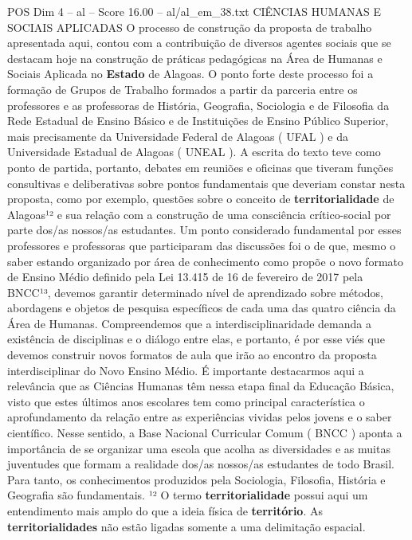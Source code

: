 \begin{textsample}{POS Dim 4 – al – Score 16.00 – al/al\_em\_38.txt}  \label{ex:f4_pos_047}
CIÊNCIAS HUMANAS E SOCIAIS APLICADAS O processo de construção da proposta de trabalho apresentada aqui, contou com a contribuição de diversos agentes sociais que se destacam hoje na construção de práticas pedagógicas na Área de Humanas e Sociais Aplicada no \textbf{Estado} de Alagoas.
O ponto forte deste processo foi a formação de Grupos de Trabalho formados a partir da parceria entre os professores e as professoras de História, Geografia, Sociologia e de Filosofia da Rede Estadual de Ensino Básico e de Instituições de Ensino Público Superior, mais precisamente da Universidade Federal de Alagoas ( UFAL ) e da Universidade Estadual de Alagoas ( UNEAL ).
A escrita do texto teve como ponto de partida, portanto, debates em reuniões e oficinas que tiveram funções consultivas e deliberativas sobre pontos fundamentais que deveriam constar nesta proposta, como por exemplo, questões sobre o conceito de \textbf{territorialidade} de Alagoas¹² e sua relação com a construção de uma consciência crítico-social por parte dos/as nossos/as estudantes.
Um ponto considerado fundamental por esses professores e professoras que participaram das discussões foi o de que, mesmo o saber estando organizado por área de conhecimento como propõe o novo formato de Ensino Médio definido pela Lei 13.415 de 16 de fevereiro de 2017 pela BNCC¹³, devemos garantir determinado nível de aprendizado sobre métodos, abordagens e objetos de pesquisa específicos de cada uma das quatro ciência da Área de Humanas.
Compreendemos que a interdisciplinaridade demanda a existência de disciplinas e o diálogo entre elas, e portanto, é por esse viés que devemos construir novos formatos de aula que irão ao encontro da proposta interdisciplinar do Novo Ensino Médio.
É importante destacarmos aqui a relevância que as Ciências Humanas têm nessa etapa final da Educação Básica, visto que estes últimos anos escolares tem como principal característica o aprofundamento da relação entre as experiências vividas pelos jovens e o saber científico.
Nesse sentido, a Base Nacional Curricular Comum ( BNCC ) aponta a importância de se organizar uma escola que acolha as diversidades e as muitas juventudes que formam a realidade dos/as nossos/as estudantes de todo Brasil.
Para tanto, os conhecimentos produzidos pela Sociologia, Filosofia, História e Geografia são fundamentais. ¹² O termo \textbf{territorialidade} possui aqui um entendimento mais amplo do que a ideia física de \textbf{território}.
As \textbf{territorialidades} não estão ligadas somente a uma delimitação espacial.

\end{textsample}
